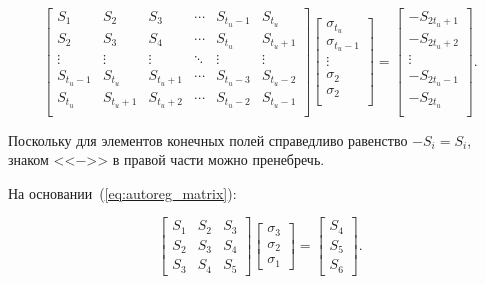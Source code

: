 \begin{equation}
  \label{eq:autoreg_matrix}
  \begin{bmatrix}
    S_1 & S_2 & S_3 & \cdots & S_{t_u-1} & S_{t_u}\\
    S_2 & S_3 & S_4 & \cdots & S_{t_u} & S_{t_u+1}\\
    \vdots & \vdots & \vdots  & \ddots & \vdots & \vdots \\
    S_{t_u-1} & S_{t_u} &  S_{t_u+1} & \cdots  & S_{t_u-3} & S_{t_u-2}\\
    S_{t_u} & S_{t_u+1} &  S_{t_u+2} & \cdots  & S_{t_u-2} & S_{t_u-1}\\
  \end{bmatrix}
  \begin{bmatrix}
    \sigma_{t_u}\\
    \sigma_{t_u-1}\\
    \vdots\\
    \sigma_{2}\\
    \sigma_{2}\\
  \end{bmatrix}
  = \begin{bmatrix}
    -S_{2t_u+1}\\
    -S_{2t_u+2}\\
    \vdots\\
    -S_{2t_u-1}\\
    -S_{2t_u}\\
  \end{bmatrix}.
\end{equation}

Поскольку для элементов конечных полей справедливо равенство $-S_i =
S_i$, знаком <<$-$>> в правой части можно пренебречь.

На основании~(\ref{eq:autoreg_matrix}):

\begin{equation}
  \label{eq:my_autoreg_matrix}
  \begin{bmatrix}
    S_1 & S_2 & S_3 \\
    S_2 & S_3 & S_4 \\
    S_3 & S_4 & S_5
  \end{bmatrix}
  \begin{bmatrix}
    \sigma_3\\
    \sigma_2\\
    \sigma_1
  \end{bmatrix} =
  \begin{bmatrix}
    S_4\\
    S_5\\
    S_6
  \end{bmatrix}.
\end{equation}

